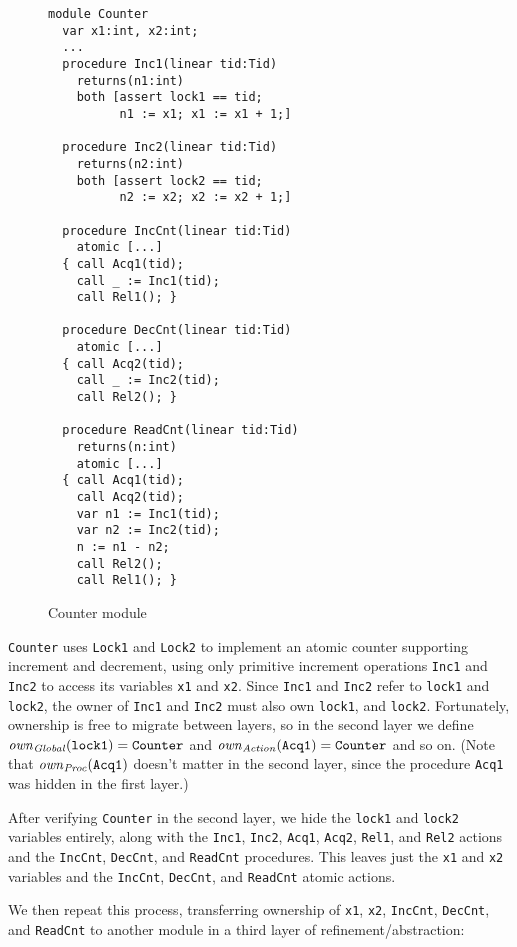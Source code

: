 \begin{figure}
\begin{verbatim}
module Counter
  var x1:int, x2:int;
  ...
  procedure Inc1(linear tid:Tid)
    returns(n1:int)
    both [assert lock1 == tid;
          n1 := x1; x1 := x1 + 1;]

  procedure Inc2(linear tid:Tid)
    returns(n2:int)
    both [assert lock2 == tid;
          n2 := x2; x2 := x2 + 1;]

  procedure IncCnt(linear tid:Tid)
    atomic [...]
  { call Acq1(tid);
    call _ := Inc1(tid);
    call Rel1(); }

  procedure DecCnt(linear tid:Tid)
    atomic [...]
  { call Acq2(tid);
    call _ := Inc2(tid);
    call Rel2(); }

  procedure ReadCnt(linear tid:Tid)
    returns(n:int)
    atomic [...]
  { call Acq1(tid);
    call Acq2(tid);
    var n1 := Inc1(tid);
    var n2 := Inc2(tid);
    n := n1 - n2;
    call Rel2();
    call Rel1(); }
\end{verbatim}
\caption{Counter module}
\label{fig:counterModule}
\end{figure}

\verb`Counter` uses \verb`Lock1` and \verb`Lock2` to implement an atomic counter supporting increment and decrement,
using only primitive increment operations \verb`Inc1` and \verb`Inc2` to access its variables \verb`x1` and \verb`x2`.
Since \verb`Inc1` and \verb`Inc2` refer to \verb`lock1` and \verb`lock2`,
the owner of \verb`Inc1` and \verb`Inc2` must also own \verb`lock1`, and \verb`lock2`.
Fortunately, ownership is free to migrate between layers,
so in the second layer we define
$\mathit{own}_{\mathit{Global}}(\mathtt{lock1}) = \mathtt{Counter}$ and $\mathit{own}_{\mathit{Action}}(\mathtt{Acq1}) = \mathtt{Counter}$ and so on.
(Note that $\mathit{own}_{\mathit{Proc}}(\mathtt{Acq1})$ doesn't matter in the second layer,
since the procedure \verb`Acq1` was hidden in the first layer.)

After verifying \verb`Counter` in the second layer,
we hide the \verb`lock1` and \verb`lock2` variables entirely,
along with the \verb`Inc1`, \verb`Inc2`, \verb`Acq1`, \verb`Acq2`, \verb`Rel1`, and \verb`Rel2` actions
and the \verb`IncCnt`, \verb`DecCnt`, and \verb`ReadCnt` procedures.
This leaves just the \verb`x1` and \verb`x2` variables
and the \verb`IncCnt`, \verb`DecCnt`, and \verb`ReadCnt` atomic actions.

We then repeat this process, transferring ownership of
\verb`x1`, \verb`x2`, \verb`IncCnt`, \verb`DecCnt`, and \verb`ReadCnt`
to another module in a third layer of refinement/abstraction:

